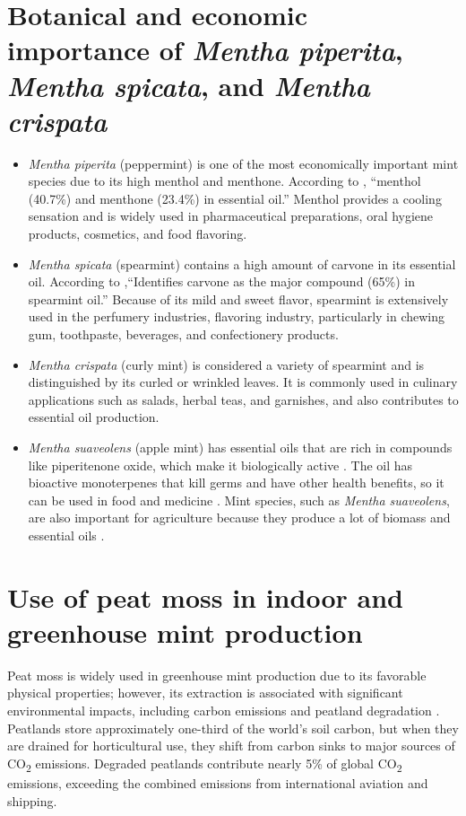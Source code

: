\section{Botanical and economic importance of \textit{Mentha piperita}, 
\textit{Mentha spicata}, and \textit{Mentha crispata}}

\begin{itemize}
    \item \textit{Mentha piperita} (peppermint) is one of the most economically important mint species due to its high menthol and menthone. According to \textcite{Schmidt2009}, ``menthol (40.7\%) and menthone (23.4\%) in essential oil.'' Menthol provides a cooling sensation and is widely used in pharmaceutical preparations, oral hygiene products, cosmetics, and food flavoring.

    \item \textit{Mentha spicata} (spearmint) contains a high amount of carvone in its essential oil. According to \textcite{Pino1998},``Identifies carvone as the major compound (65\%) in spearmint oil.'' Because of its mild and sweet flavor, spearmint is extensively used in the perfumery industries, flavoring industry, particularly in chewing gum, toothpaste, beverages, and confectionery products.

    \item \textit{Mentha crispata} (curly mint) is considered a variety of spearmint and is distinguished by its curled or wrinkled leaves. It is commonly used in culinary applications such as salads, herbal teas, and garnishes, and also contributes to essential oil production.

    \item \textit{Mentha suaveolens} (apple mint) has essential oils that are rich in compounds like piperitenone oxide, which make it biologically active \textcite{Kokkini2013}. The oil has bioactive monoterpenes that kill germs and have other health benefits, so it can be used in food and medicine \textcite{Hussain2010}. Mint species, such as \textit{Mentha suaveolens}, are also important for agriculture because they produce a lot of biomass and essential oils \textcite{Zheljazkov2013}.
\end{itemize}        

\section{Use of peat moss in indoor and greenhouse mint production}
Peat moss is widely used in greenhouse mint production due to its favorable physical properties; however, its extraction is associated with significant environmental impacts, including carbon emissions and peatland degradation \textcite{Cleary2021}. Peatlands store approximately one-third of the world’s soil carbon, but when they are drained for horticultural use, they shift from carbon sinks to major sources of CO\textsubscript{2} emissions. Degraded peatlands contribute nearly 5\% of global CO\textsubscript{2} emissions, exceeding the combined emissions from international aviation and shipping. 

